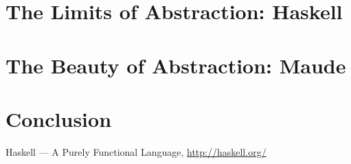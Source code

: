\documentclass[abstracton,a4paper,twocolumn,9pt]{scrartcl}
\begin{document}
\section{The Limits of Abstraction: Haskell}

\section{The Beauty of Abstraction: Maude}


\section{Conclusion} %

\begin{thebibliography}{9}
      Haskell --- A Purely Functional Language,
      \url{http://haskell.org/}

\end{thebibliography}
\end{document}
